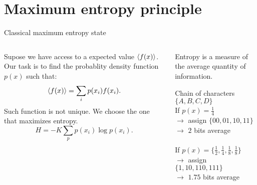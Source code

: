 
\section{Maximum entropy principle}

\begin{frame}{Classical maximum entropy state}
    \begin{columns}
        \begin{column}{0.5\textwidth}
            Supose we have access to a expected value $\expval{f(x)}$. Our task is to find the probablity density function $p(x)$ such that:
            \begin{equation*}
                \expval{f(x)}=\sum_{i}p(x_{i})f(x_{i}).
            \end{equation*}
            Such function is not unique. We choose the one that maximizes entropy.
                \begin{equation*}
                    H=-K\sum_{p}p(x_{i})\log{p(x_{i})}.
                \end{equation*}
        \end{column}
        \begin{column}{0.5\textwidth}
                Entropy is a measure of the average quantity of information. \\
                \vspace{0.2cm}
                \begin{tcolorbox}
                    Chain of characters $\{A,B,C,D\}$\\
                    If $p(x)=\frac{1}{4}$\\
                    $\rightarrow$ assign $\{00, 01, 10, 11\}$\\
                    $\rightarrow$ $2$ bits average\\
                    \\
                    If $p(x)=\{\frac{1}{2},\frac{1}{4},\frac{1}{8},\frac{1}{8}\}$\\
                    $\rightarrow$ assign $\{1, 10, 110, 111\}$\\
                    $\rightarrow$ $1.75$  bits average
                \end{tcolorbox}
        \end{column}
    \end{columns}
\end{frame}

